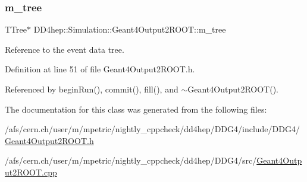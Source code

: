 \subsubsection{\texorpdfstring{m\+\_\+tree}{m\_tree}}
{\footnotesize\ttfamily T\+Tree$\ast$ D\+D4hep\+::\+Simulation\+::\+Geant4\+Output2\+R\+O\+O\+T\+::m\+\_\+tree\hspace{0.3cm}{\ttfamily [protected]}}



Reference to the event data tree. 



Definition at line 51 of file Geant4\+Output2\+R\+O\+O\+T.\+h.



Referenced by begin\+Run(), commit(), fill(), and $\sim$\+Geant4\+Output2\+R\+O\+O\+T().



The documentation for this class was generated from the following files\+:\begin{DoxyCompactItemize}
\item 
/afs/cern.\+ch/user/m/mpetric/nightly\+\_\+cppcheck/dd4hep/\+D\+D\+G4/include/\+D\+D\+G4/\hyperlink{_geant4_output2_r_o_o_t_8h}{Geant4\+Output2\+R\+O\+O\+T.\+h}\item 
/afs/cern.\+ch/user/m/mpetric/nightly\+\_\+cppcheck/dd4hep/\+D\+D\+G4/src/\hyperlink{_geant4_output2_r_o_o_t_8cpp}{Geant4\+Output2\+R\+O\+O\+T.\+cpp}\end{DoxyCompactItemize}
